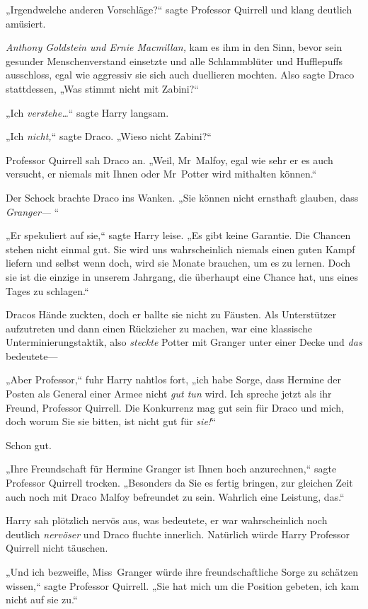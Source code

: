 {„Irgendwelche anderen Vorschläge?“ sagte Professor Quirrell und klang deutlich amüsiert.

\emph{Anthony Goldstein und Ernie Macmillan,} kam es ihm in den Sinn, bevor sein gesunder Menschenverstand einsetzte und alle Schlammblüter und Hufflepuffs ausschloss, egal wie aggressiv sie sich auch duellieren mochten. Also sagte Draco stattdessen, „Was stimmt nicht mit Zabini?“

„Ich \emph{verstehe…}“ sagte Harry langsam.

„Ich \emph{nicht,}“ sagte Draco. „Wieso nicht Zabini?“

Professor Quirrell sah Draco an. „Weil, Mr~Malfoy, egal wie sehr er es auch versucht, er niemals mit Ihnen oder Mr~Potter wird mithalten können.“

Der Schock brachte Draco ins Wanken. „Sie können nicht ernsthaft glauben, dass \emph{Granger—} “

„Er spekuliert auf sie,“ sagte Harry leise. „Es gibt keine Garantie. Die Chancen stehen nicht einmal gut. Sie wird uns wahrscheinlich niemals einen guten Kampf liefern und selbst wenn doch, wird sie Monate brauchen, um es zu lernen. Doch sie ist die einzige in unserem Jahrgang, die überhaupt eine Chance hat, uns eines Tages zu schlagen.“

Dracos Hände zuckten, doch er ballte sie nicht zu Fäusten. Als Unterstützer aufzutreten und dann einen Rückzieher zu machen, war eine klassische Unterminierungstaktik, also \emph{steckte} Potter mit Granger unter einer Decke und \emph{das} bedeutete—

„Aber Professor,“ fuhr Harry nahtlos fort, „ich habe Sorge, dass Hermine der Posten als General einer Armee nicht \emph{gut tun} wird. Ich spreche jetzt als ihr Freund, Professor Quirrell. Die Konkurrenz mag gut sein für Draco und mich, doch worum Sie sie bitten, ist nicht gut für \emph{sie!}“

Schon gut.

„Ihre Freundschaft für Hermine Granger ist Ihnen hoch anzurechnen,“ sagte Professor Quirrell trocken. „Besonders da Sie es fertig bringen, zur gleichen Zeit auch noch mit Draco Malfoy befreundet zu sein. Wahrlich eine Leistung, das.“

Harry sah plötzlich nervös aus, was bedeutete, er war wahrscheinlich noch deutlich \emph{nervöser} und Draco fluchte innerlich. Natürlich würde Harry Professor Quirrell nicht täuschen.

„Und ich bezweifle, Miss~Granger würde ihre freundschaftliche Sorge zu schätzen wissen,“ sagte Professor Quirrell. „Sie hat mich um die Position gebeten, ich kam nicht auf sie zu.“

}
